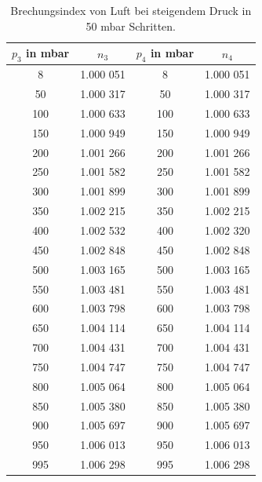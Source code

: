 \begin{table}[H]
    \center
    \caption{Brechungsindex von Luft bei steigendem Druck in 50 mbar Schritten.}
    \label{tab:druckdaten2}
    \begin{tabular}{c|c|c|c}
      $p_3$ in mbar&$n_3$ &$p_4$ in mbar &$n_4$\\
      \hline
      8  & 1.000 051& 8  & 1.000 051\\
      50 & 1.000 317& 50 & 1.000 317\\
      100& 1.000 633& 100& 1.000 633\\
      150& 1.000 949& 150& 1.000 949\\
      200& 1.001 266& 200& 1.001 266\\
      250& 1.001 582& 250& 1.001 582\\
      300& 1.001 899& 300& 1.001 899\\
      350& 1.002 215& 350& 1.002 215\\
      400& 1.002 532& 400& 1.002 320\\
      450& 1.002 848& 450& 1.002 848\\
      500& 1.003 165& 500& 1.003 165\\
      550& 1.003 481& 550& 1.003 481\\
      600& 1.003 798& 600& 1.003 798\\
      650& 1.004 114& 650& 1.004 114\\
      700& 1.004 431& 700& 1.004 431\\
      750& 1.004 747& 750& 1.004 747\\
      800& 1.005 064& 800& 1.005 064\\
      850& 1.005 380& 850& 1.005 380\\
      900& 1.005 697& 900& 1.005 697\\
      950& 1.006 013& 950& 1.006 013\\
      995& 1.006 298& 995& 1.006 298\\
    \end{tabular}
\end{table}
